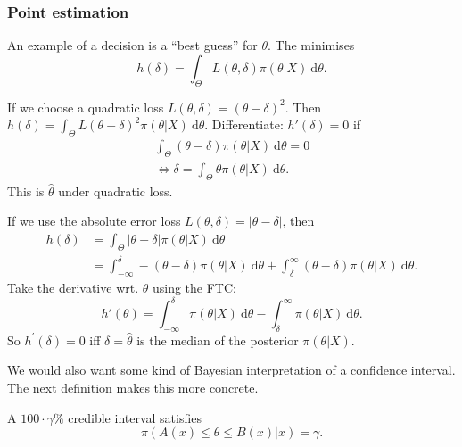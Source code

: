\documentclass[egregdoesnotlikesansseriftitles,a4paper]{scrartcl}
\begin{document}
\subsubsection*{Point estimation}
An example of a decision is a ``best guess'' for $\theta $. The  minimises \[
h \left(\delta \right)=\int_{\Theta }^{} L \left(\theta ,\delta \right) \pi \left(\theta |X\right) \ \mathrm{d}\theta  
.\]
\begin{example*}
      If we choose a quadratic loss $L \left(\theta ,\delta \right)=\left(\theta -\delta \right)^{2}$. Then $h \left(\delta \right)=\int_{\Theta }^{} L \left(\theta -\delta \right)^{2} \pi \left(\theta |X\right) \ \mathrm{d}\theta  $. Differentiate: $h' \left(\delta \right)=0$ if 
      \begin{align*}
          \int_{\Theta }^{}\left(\theta -\delta \right)\pi \left(\theta |X\right) \ \mathrm{d}\theta =0 \\
          \iff \delta =\int_{\Theta }^{}\theta \pi \left(\theta |X\right) \ \mathrm{d}\theta . 
      \end{align*}
      This is $\hat{\theta}$ under quadratic loss.
\end{example*}
\begin{example*}
      If we use the absolute error loss $L \left(\theta ,\delta \right)=\left|\theta -\delta \right|$, then
      \begin{align*}
          h \left(\delta \right)&=\int_{\Theta }^{} \left|\theta -\delta \right| \pi \left(\theta |X\right) \ \mathrm{d}\theta\\
          &= \int_{-\infty}^{\delta }- \left(\theta -\delta \right) \pi  \left(\theta |X\right) \ \mathrm{d}\theta + \int_{\delta }^{\infty } \left(\theta -\delta \right) \pi  \left(\theta |X\right) \ \mathrm{d}\theta.
      \end{align*}
      Take the derivative wrt. $\theta $ using the FTC: \[
      h' \left(\theta \right)=\int_{-\infty}^{\delta }\pi  \left(\theta |X\right) \ \mathrm{d}\theta - \int_{\delta }^{\infty}\pi \left(\theta |X\right) \ \mathrm{d}\theta   
      .\] So $h^\prime \left(\delta \right)=0$ iff $\delta =\hat{\theta}$ is the median of the posterior $\pi \left(\theta |X\right)$.  
\end{example*}
We would also want some kind of Bayesian interpretation of a confidence interval. The next definition makes this more concrete.
\begin{definition*}
      A $100 \cdot \gamma \%$ credible interval satisfies \[
      \pi (A (x)\leq \theta \leq B (x)|x)=\gamma 
      .\]
\end{definition*}
\end{document}
